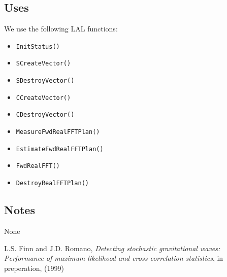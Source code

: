 \documentclass{article}
\begin{document}
\subsection{Uses}

We use the following LAL functions:

\begin{itemize}
\item{\tt InitStatus()\/}
\item{\tt SCreateVector()\/}
\item{\tt SDestroyVector()\/}
\item{\tt CCreateVector()\/}
\item{\tt CDestroyVector()\/}
\item{\tt MeasureFwdRealFFTPlan()\/}
\item{\tt EstimateFwdRealFFTPlan()\/}
\item{\tt FwdRealFFT()\/}
\item{\tt DestroyRealFFTPlan()\/}
\end{itemize}

\subsection{Notes}

None 

\begin{thebibliography}{0}

L.S. Finn and J.D. Romano, \emph{Detecting stochastic gravitational waves: Performance of 
maximum-likelihood and cross-correlation statistics}, in preperation, (1999)

\end{thebibliography}
\end{document}
